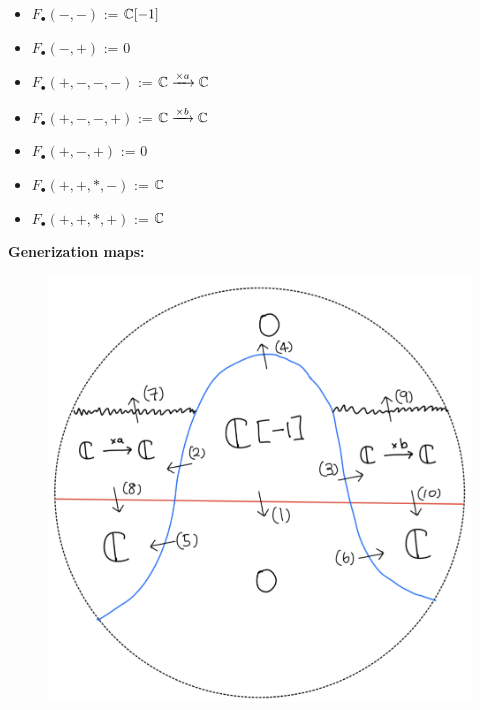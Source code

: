\begin{itemize}
\item $F_\bullet(-,-)$ := $\mathbb{C}[-1]$
\item $F_\bullet(-,+)$ := $0$
\item $F_\bullet(+,-,-,-)$ := $\mathbb{C} \xrightarrow{\times a} \mathbb{C} $
\item $F_\bullet(+,-,-,+)$ := $\mathbb{C} \xrightarrow{\times b} \mathbb{C} $
\item $F_\bullet(+,-,+)$ := $0$
\item $F_\bullet(+,+,*,-)$ := $\mathbb{C}$
\item $F_\bullet(+,+,*,+)$ := $\mathbb{C}$
\end{itemize}

\textbf{Generization maps:}
\begin{figure}[H]
    \centering
    \includegraphics[scale = 0.45]{diagrams/lemma2/40.png} 
    \caption{}
    \label{fig:your-label}
\end{figure}
